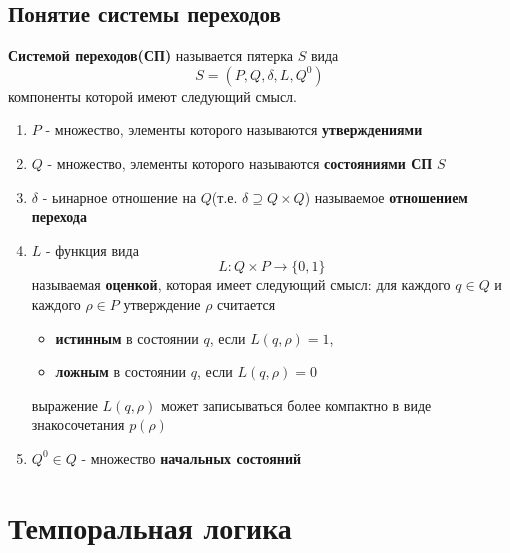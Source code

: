 \documentclass[12pt, twoside]{report}
\begin{document}
\subsection*{Понятие системы переходов}
\label{system_sequence_BASE}
\textbf{Системой переходов(СП)} называется пятерка $S$ вида
\begin{equation}\label{formula:1}
S = (P, Q, \delta, L, Q^0)
\end{equation}
компоненты которой имеют следующий смысл.
\begin{enumerate}
  \item $P$ - множество, элементы которого называются \textbf{утверждениями}
  \item $Q$ - множество, элементы которого называются \textbf{состояниями СП} $S$
  \item $\delta$ - ьинарное отношение на $Q$(т.е. $\delta \supseteq Q \times Q$) называемое 
        \textbf{отношением перехода}
  \item $L$ - функция вида
        \begin{equation}
		  L : Q \times P \to \{0, 1\}
		\end{equation}
		называемая \textbf{оценкой}, которая имеет следующий смысл: для каждого $q \in Q$ и 
		каждого $\rho \in P$ утверждение $\rho$ считается
		\begin{itemize}
		  \item \textbf{истинным} в состоянии $q$, если $L(q,\rho) = 1$, 
		  \item \textbf{ложным} в состоянии $q$, если $L(q,\rho) = 0$
		\end{itemize}
		выражение $L(q,\rho)$ может записываться более компактно в виде знакосочетания $p(\rho)$
  \item $Q^0 \in Q$ - множество \textbf{начальных состояний}   
\end{enumerate}

\section*{Темпоральная логика}\label{temporal_LOGIC}
\end{document}
